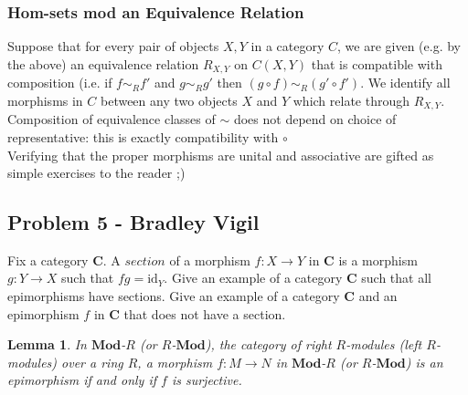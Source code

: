 \documentclass{article}
\newtheorem{lemma}[subsection]{Lemma}
\begin{document}
	\subsubsection{Hom-sets mod an Equivalence Relation}
	Suppose that for every pair of objects $X,Y$ in a category $C$, we are given (e.g. by the above) an equivalence relation $R_{X,Y}$ on $C(X,Y)$ that is compatible with composition (i.e. if $f\sim_Rf'$ and $g\sim_Rg'$ then $(g\circ{}f)\sim_R(g'\circ{}f')$.  We identify all morphisms in $C$ between any two objects $X$ and $Y$ which relate through $R_{X,Y}$.  Composition of equivalence classes of $\sim{}$ does not depend on choice of representative: this is exactly compatibility with $\circ{}$\\Verifying that the proper morphisms are unital and associative are gifted as simple exercises to the reader ;)
	
	\subsection{Problem 5 - Bradley Vigil}
Fix a category $\textbf{C}$. A $\textit{section}$ of a morphism $f:X\to Y$ in $\textbf{C}$ is a morphism $g:Y\to X$ such that $fg=\text{id}_{Y}$. Give an example of a category $\textbf{C}$ such that all epimorphisms have sections. Give an example of a category $\textbf{C}$ and an epimorphism $f$ in $\textbf{C}$ that does not have a section.

\begin{lemma}
In $\mathbf{Mod}$-$R$ (or $R$-$\mathbf{Mod}$), the category of right $R$-modules (left $R$-modules) over a ring $R$, a morphism $f:M\to N$ in $\mathbf{Mod}$-$R$ (or $R$-$\mathbf{Mod}$) is an epimorphism if and only if $f$ is surjective.
\end{lemma}
\end{document}
